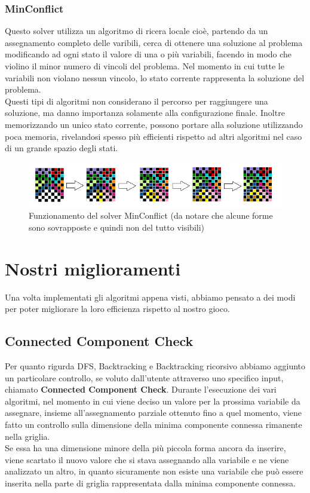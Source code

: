 \subsubsection{MinConflict}
Questo solver utilizza un algoritmo di ricera locale cioè, partendo da un assegnamento completo delle varibili, cerca di ottenere una soluzione al problema modificando ad ogni stato il valore di una o più variabili, facendo in modo che violino il minor numero di vincoli del problema. Nel momento in cui tutte le variabili non violano nessun vincolo, lo stato corrente rappresenta la soluzione del problema.\\
Questi tipi di algoritmi non considerano il percorso per raggiungere una soluzione, ma danno importanza solamente alla configurazione finale. Inoltre memorizzando un unico stato corrente, possono portare alla soluzione utilizzando poca memoria, rivelandosi spesso più efficienti rispetto ad altri algoritmi nel caso di un grande spazio degli stati.

\begin{figure}[h]
	\centering
	\includegraphics[scale=0.75]{immagini/mc}
	\caption{Funzionamento del solver MinConflict (da notare che alcune forme sono sovrapposte e quindi non del tutto visibili)}
	\label{fig:mc}
\end{figure}


\newpage
\section{Nostri miglioramenti}
\label{migliorie}
Una volta implementati gli algoritmi appena visti, abbiamo pensato a dei modi per poter migliorare la loro efficienza rispetto al nostro gioco. \\

\subsection{Connected Component Check}
Per quanto rigurda DFS, Backtracking e Backtracking ricorsivo abbiamo aggiunto un particolare controllo, se voluto dall'utente attraverso uno specifico input, chiamato \textbf{Connected Component Check}.
Durante l'esecuzione dei vari algoritmi, nel momento in cui viene deciso un valore per la prossima variabile da assegnare, insieme all'assegnamento parziale ottenuto fino a quel momento, viene fatto un controllo sulla dimensione della minima componente connessa rimanente nella griglia. \\
Se essa ha una dimensione minore della più piccola forma ancora da inserire, viene scartato il nuovo valore che si stava assegnando alla variabile e ne viene analizzato un altro, in quanto sicuramente non esiste una variabile che può essere inserita nella parte di griglia rappresentata dalla minima componente connessa. 

